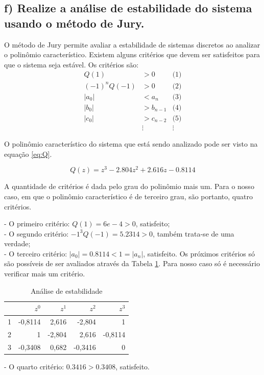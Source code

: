     \subsection*{f) Realize a análise de estabilidade do sistema usando o método de Jury.}  
        O método de Jury permite avaliar a estabilidade de sistemas discretos ao analizar o polinômio característico.
        Existem alguns critérios que devem ser satisfeitos para que o sistema seja estável. Os critérios são: 
        \begin{align*}
            Q(1) &> 0  &\text{(1)}\\
            (-1)^n Q(-1) &> 0 &\text{(2)}\\
            |a_0| &< a_n &\text{(3)}\\
            |b_0| &> b_{n-1} &\text{(4)}\\
            |c_0| &> c_{n-2} &\text{(5)} \\
            &\vdots &\vdots 
        \end{align*} 

        O polinômio característico do sistema
        que está sendo analizado pode ser visto na equação \ref{eq:Q}.

        \begin{equation}
            Q(z) = z^3 - 2.804 z^2 + 2.616 z - 0.8114
            \label{eq:Q}
        \end{equation}
        
        A quantidade de critérios é dada pelo grau do polinômio mais um. Para o nosso caso, em que o polinômio característico é 
        de terceiro grau, são portanto, quatro critérios. 
        
        - O primeiro critério: $Q(1)= 6e-4 > 0$, satisfeito; \\
        - O segundo critério: $-1^3 Q(-1) = 5.2314 > 0$, também trata-se de uma verdade;\\
        - O terceiro critério: $|a_0| = 0.8114 < 1 = |a_n| $, satisfeito.
        \newpage
        Os  próximos critérios só são possíveis de ser avaliados através da Tabela \ref{tab:J1}. Para nosso caso só é necessário
        verificar mais um critério. 
        \begin{table}[!ht]
            \centering
            \caption{Análise de estabilidade} 
            \begin{tabular}{l| r r r r}
                 & $z^0$ & $z^1$ & $z^2$ & $z^3$\\
                \hline
                1 & -0{,}8114 & 2{,}616 & -2{,}804 & 1\\
                2 & 1 & -2{,}804 & 2{,}616 & -0{,}8114\\
                3 & -0{,}3408 & 0{,}682 & -0{,}3416 & 0\\
            \end{tabular}                
            \label{tab:J1}
        \end{table}

        - O quarto critério: $0.3416 > 0.3408$, satisfeito. 

         
        
        